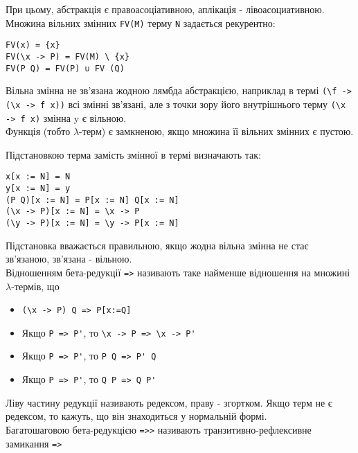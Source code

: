 \documentclass[12pt]{article}
\begin{document}
При цьому, абстракція є правоасоціативною, аплікація - лівоасоциативною.\\

Множина вільних змінних \lstinline{FV(M)} терму \lstinline{N} задається рекурентно:\\
\begin{lstlisting}[caption={Вільні змінні}]
FV(x) = {x}
FV(\x -> P) = FV(M) \ {x}
FV(P Q) = FV(P) ∪ FV (Q)
\end{lstlisting}

Вільна змінна не зв'язана жодною лямбда абстракцією, наприклад в термі \lstinline{(\f -> (\x -> f x))} всі змінні зв'язані, але з точки зору його внутрішнього терму \lstinline{(\x -> f x)} змінна y є вільною.\\

Функція (тобто $\lambda$-терм) є замкненою, якщо множина її вільних змінних є пустою.

Підстановкою терма замість змінної в термі визначають так:
\begin{lstlisting}[caption={Вільні змінні}]
x[x := N] = N
y[x := N] = y
(P Q)[x := N] = P[x := N] Q[x := N]
(\x -> P)[x := N] = \x -> P
(\y -> P)[x := N] = \y -> P[x := N]
\end{lstlisting}

Підстановка вважається правильною, якщо жодна вільна змінна не стає зв'язаною, зв'язана - вільною.\\

Відношенням бета-редукції \lstinline{=>} називають таке найменше відношення на множині $\lambda$-термів, що \\
\begin{itemize}
    \item \lstinline{(\x -> P) Q => P[x:=Q]}
    \item Якщо \lstinline{P => P'}, то \lstinline{\x -> P => \x -> P'}
    \item Якщо \lstinline{P => P'}, то \lstinline{P Q => P' Q}
    \item Якщо \lstinline{P => P'}, то \lstinline{Q P => Q P'}
\end{itemize}

Ліву частину редукції називають редексом, праву - згортком. Якщо терм не є редексом, то кажуть, що він знаходиться у нормальній формі.\\

Багатошаговою бета-редукцією \lstinline{=>>} називають транзитивно-рефлексивне замикання \lstinline{=>}\\
\end{document}
